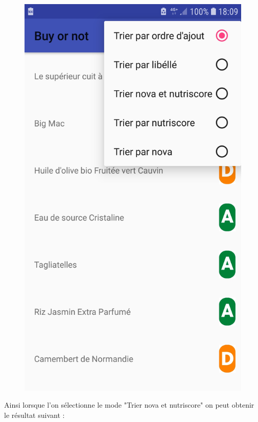 \documentclass[report]{BetterDocument}
\begin{document}
	\begin{figure}[H]
		\centering\includegraphics[width=0.5\paperwidth, height=0.3\paperheight, keepaspectratio]{img/tri.jpg}
	\end{figure}

	Ainsi lorsque l'on sélectionne le mode "Trier nova et nutriscore" on peut obtenir le résultat suivant :
\end{document}
